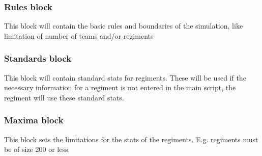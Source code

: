 		\subsubsection{Rules block}
		This block will contain the basic rules and boundaries of the simulation, 
		like limitation of number of teams and/or regiments
		
		\subsubsection{Standards block}
		This block will contain standard stats for regiments. These will be used if the necessary 
		information for a regiment is not entered in the main script, the regiment will use these standard stats.
		
		\subsubsection{Maxima block}
		This block sets the limitations for the stats of the regiments. E.g. regiments must be of size 200 or less.

		